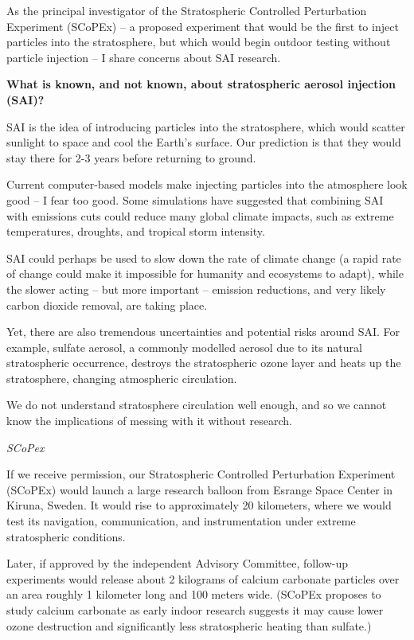 \documentclass[
]{book}
\begin{document}
As the principal investigator of the Stratospheric Controlled Perturbation Experiment (SCoPEx) -- a proposed experiment that would be the first to inject particles into the stratosphere, but which would begin outdoor testing without particle injection -- I share concerns about SAI research.

\textbf{What is known, and not known, about stratospheric aerosol injection (SAI)?}

SAI is the idea of introducing particles into the stratosphere, which would scatter sunlight to space and cool the Earth's surface. Our prediction is that they would stay there for 2-3 years before returning to ground.

Current computer-based models make injecting particles into the atmosphere look good -- I fear too good. Some simulations have suggested that combining SAI with emissions cuts could reduce many global climate impacts, such as extreme temperatures, droughts, and tropical storm intensity.

SAI could perhaps be used to slow down the rate of climate change (a rapid rate of change could make it impossible for humanity and ecosystems to adapt), while the slower acting -- but more important -- emission reductions, and very likely carbon dioxide removal, are taking place.

Yet, there are also tremendous uncertainties and potential risks around SAI. For example, sulfate aerosol, a commonly modelled aerosol due to its natural stratospheric occurrence, destroys the stratospheric ozone layer and heats up the stratosphere, changing atmospheric circulation.

We do not understand stratosphere circulation well enough, and so we cannot know the implications of messing with it without research.

\emph{SCoPex}

If we receive permission, our Stratospheric Controlled Perturbation Experiment (SCoPEx) would launch a large research balloon from Esrange Space Center in Kiruna, Sweden. It would rise to approximately 20 kilometers, where we would test its navigation, communication, and instrumentation under extreme stratospheric conditions.

Later, if approved by the independent Advisory Committee, follow-up experiments would release about 2 kilograms of calcium carbonate particles over an area roughly 1 kilometer long and 100 meters wide. (SCoPEx proposes to study calcium carbonate as early indoor research suggests it may cause lower ozone destruction and significantly less stratospheric heating than sulfate.)
\end{document}
